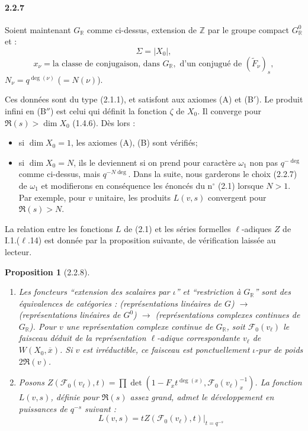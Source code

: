 \documentclass[12pt,a4paper]{article}
\theoremstyle{plain}
\newtheorem{proposition}[theorem]{Proposition}
\theoremstyle{definition}
\theoremstyle{remark}
\newcommand{\RR}{{\mathbb{R}}}
\newcommand{\ZZ}{{\mathbb{Z}}}
\begin{document}
\paragraph{2.2.7}
Soient maintenant $G_\RR$ comme ci-dessus, extension de $\ZZ$ par le groupe compact $G_\RR^0$ et :
\[ \Sigma = |X_0|, \]
\[ x_\nu = \text{la classe de conjugaison, dans } G_\RR, \text{ d'un conjugu\'e de } (\tilde{F}_\nu)_s, \]
$N_\nu = q^{\deg(\nu)}$ ($= N(\nu)$).

Ces donn\'ees sont du type (2.1.1), et satisfont aux axiomes (A) et (B$'$). Le produit infini en (B$''$) est celui qui d\'efinit la fonction $\zeta$ de $X_0$. Il converge pour $\Re(s) > \dim X_0$ (1.4.6). D\`es lors :
\begin{itemize}
\item si $\dim X_0 = 1$, les axiomes (A), (B) sont v\'erifi\'es;
\item si $\dim X_0 = N$, ils le deviennent si on prend pour caract\`ere $\omega_1$ non pas $q^{-\deg}$ comme ci-dessus, mais $q^{-N\deg}$. Dans la suite, nous garderons le choix (2.2.7) de $\omega_1$ et modifierons en cons\'equence les \'enonc\'es du n$^\circ$ (2.1) lorsque $N > 1$. Par exemple, pour $v$ unitaire, les produits $L(v,s)$ convergent pour $\Re(s) > N$.
\end{itemize}

La relation entre les fonctions $L$ de (2.1) et les s\'eries formelles $\ell$-adiques $Z$ de I.1.($\ell$.14) est donn\'ee par la proposition suivante, de v\'erification laiss\'ee au lecteur.


\begin{proposition}[2.2.8]
\begin{enumerate}[label=(\roman*)]
\item Les foncteurs ``extension des scalaires par $\iota$'' et ``restriction \`a $G_\RR$'' sont des \'equivalences de cat\'egories : (repr\'esentations lin\'eaires de $G$) $\to$ (repr\'esentations lin\'eaires de $G^0$) $\to$ (repr\'esentations complexes continues de $G_\RR$). Pour $v$ une repr\'esentation complexe continue de $G_\RR$, soit $\mathscr{F}_0(v_\ell)$ le faisceau d\'eduit de la repr\'esentation $\ell$-adique correspondante $v_\ell$ de $W(X_0, \overline{x})$. Si $v$ est irr\'eductible, ce faisceau est ponctuellement $\iota$-pur de poids $2\Re(v)$.
\item Posons $Z(\mathscr{F}_0(v_\ell), t) = \prod \det(1 - F_x t^{\deg(x)}, \mathscr{F}_0(v_\ell)_x^{-1})$. La fonction $L(v,s)$, d\'efinie pour $\Re(s)$ assez grand, admet le d\'eveloppement en puissances de $q^{-s}$ suivant :
\begin{equation}\label{eq:2.2.8.1}
L(v,s) = tZ(\mathscr{F}_0(v_\ell), t)|_{t = q^{-s}}
\end{equation}
\end{enumerate}
\end{proposition}
\end{document}
